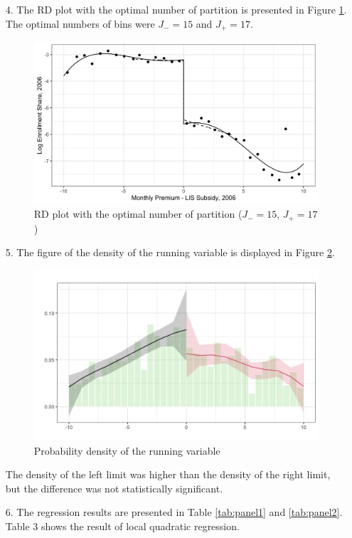 \documentclass[12pt]{article}
\begin{document}
\begin{itemize}
\item[4.] The RD plot with the optimal number of partition is presented in Figure \ref{fig:binopt}. The optimal numbers of bins were $J_-=15$ and $J_+=17$.
\begin{figure} [ht]
	\centering
	\includegraphics[scale=0.15]{../output/fig_binopt.jpg}
	\caption{RD plot with the optimal number of partition ($J_-=15$, $J_+=17$)}
	\label{fig:binopt}
\end{figure}

\item[5.] The figure of the density of the running variable is displayed in Figure \ref{fig:density}.
\begin{figure}
	\centering
	\includegraphics[scale=0.8]{../output/fig_density.jpg}
	\caption{Probability density of the running variable}
	\label{fig:density}
\end{figure}
The density of the left limit was higher than the density of the right limit, but the difference was not statistically significant.

\item[6.] The regression results are presented in Table \ref{tab:panel1} and \ref{tab:panel2}. Table 3 shows the result of local quadratic regression.




\end{itemize}
\end{document}

